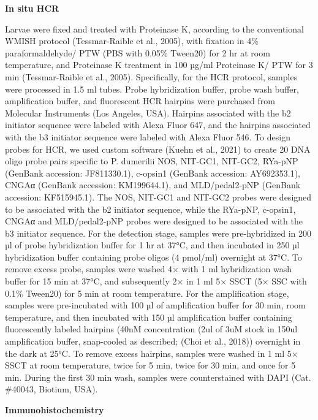 \documentclass[
  10pt,
  onecolumn]{article}
\begin{document}
\textbf{In situ HCR}

Larvae were fixed and treated with Proteinase K, according to the
conventional WMISH protocol (Tessmar-Raible et al., 2005), with fixation
in 4\% paraformaldehyde/ PTW (PBS with 0.05\% Tween20) for 2 hr at room
temperature, and Proteinase K treatment in 100 µg/ml Proteinase K/ PTW
for 3 min (Tessmar-Raible et al., 2005). Specifically, for the HCR
protocol, samples were processed in 1.5 ml tubes. Probe hybridization
buffer, probe wash buffer, amplification buffer, and fluorescent HCR
hairpins were purchased from Molecular Instruments (Los Angeles, USA).
Hairpins associated with the b2 initiator sequence were labeled with
Alexa Fluor 647, and the hairpins associated with the b3 initiator
sequence were labeled with Alexa Fluor 546. To design probes for HCR, we
used custom software (Kuehn et al., 2021) to create 20 DNA oligo probe
pairs specific to P. dumerilii NOS, NIT-GC1, NIT-GC2, RYa-pNP (GenBank
accession: JF811330.1), c-opsin1 (GenBank accession: AY692353.1), CNGAα
(GenBank accession: KM199644.1), and MLD/pedal2-pNP (GenBank accession:
KF515945.1). The NOS, NIT-GC1 and NIT-GC2 probes were designed to be
associated with the b2 initiator sequence, while the RYa-pNP, c-opsin1,
CNGAα and MLD/pedal2-pNP probes were designed to be associated with the
b3 initiator sequence. For the detection stage, samples were
pre-hybridized in 200 µl of probe hybridization buffer for 1 hr at 37°C,
and then incubated in 250 µl hybridization buffer containing probe
oligos (4 pmol/ml) overnight at 37°C. To remove excess probe, samples
were washed 4× with 1 ml hybridization wash buffer for 15 min at 37°C,
and subsequently 2× in 1 ml 5× SSCT (5× SSC with 0.1\% Tween20) for 5
min at room temperature. For the amplification stage, samples were
pre-incubated with 100 µl of amplification buffer for 30 min, room
temperature, and then incubated with 150 µl amplification buffer
containing fluorescently labeled hairpins (40nM concentration (2ul of
3uM stock in 150ul amplification buffer, snap-cooled as described; (Choi
et al., 2018)) overnight in the dark at 25°C. To remove excess hairpins,
samples were washed in 1 ml 5× SSCT at room temperature, twice for 5
min, twice for 30 min, and once for 5 min. During the first 30 min wash,
samples were counterstained with DAPI (Cat. \#40043, Biotium, USA).

\textbf{Immunohistochemistry}
\end{document}
